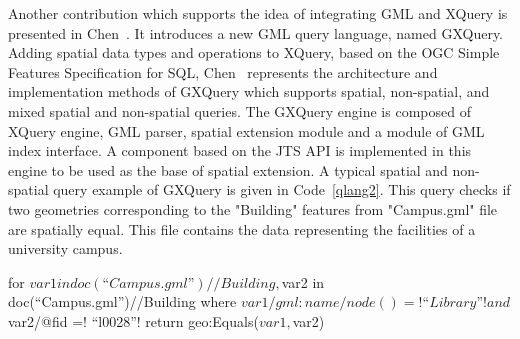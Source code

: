 \documentclass[a4paper,12pt]{article}
\begin{document}
\vspace{10px}
\vspace{10px}

Another contribution which supports the idea of integrating GML and XQuery is presented in Chen~\cite{Chen2010}.
It introduces a new GML query language, named GXQuery. 
Adding spatial data types and operations to XQuery, based on the OGC Simple Features Specification for SQL, 
Chen~\cite{Chen2010} represents the architecture and implementation methods of GXQuery 
which supports spatial, non-spatial, and mixed spatial and non-spatial queries. 
The GXQuery engine is composed of XQuery engine, GML parser, spatial extension module 
and a module of GML index interface. 
A component based on the JTS API is implemented in this engine
to be used as the base of spatial extension. 
A typical spatial and non-spatial query example of GXQuery is given in Code~\ref{qlang2}.
This query checks if two geometries corresponding to the "Building" features from 
"Campus.gml" file are spatially equal. This file contains the data representing
the facilities of a university campus.
\vspace{10px}
\begin{fakeXML}[escapechar=\!,label=qlang2,caption=A typical example of combined spatial and non-spatial query in GXQuery.]
for $var1 in doc(“Campus.gml”)//Building,
    $var2 in doc(“Campus.gml”)//Building
where 
    $var1/gml:name/node()=! “Library”! and $var2/@fid =! “l0028”! 
return geo:Equals($var1, $var2)
\end{fakeXML}
\vspace{10px}
\end{document}

